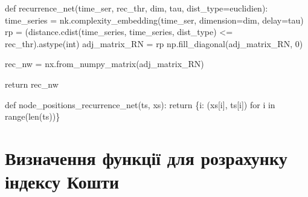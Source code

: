\documentclass[
  letterpaper,
]{report}
\newenvironment{Shaded}{\begin{snugshade}}{\end{snugshade}}
\newcommand{\BuiltInTok}[1]{\textcolor[rgb]{0.00,0.23,0.31}{#1}}
\newcommand{\ControlFlowTok}[1]{\textcolor[rgb]{0.00,0.23,0.31}{#1}}
\newcommand{\DecValTok}[1]{\textcolor[rgb]{0.68,0.00,0.00}{#1}}
\newcommand{\KeywordTok}[1]{\textcolor[rgb]{0.00,0.23,0.31}{#1}}
\newcommand{\NormalTok}[1]{\textcolor[rgb]{0.00,0.23,0.31}{#1}}
\newcommand{\OperatorTok}[1]{\textcolor[rgb]{0.37,0.37,0.37}{#1}}
\newcommand{\StringTok}[1]{\textcolor[rgb]{0.13,0.47,0.30}{#1}}
\begin{document}
\begin{Shaded}
\begin{Highlighting}[]
\KeywordTok{def}\NormalTok{ recurrence\_net(time\_ser, rec\_thr, dim, tau, dist\_type}\OperatorTok{=}\StringTok{\textquotesingle{}euclidien\textquotesingle{}}\NormalTok{):}
\NormalTok{    time\_series }\OperatorTok{=}\NormalTok{ nk.complexity\_embedding(time\_ser, dimension}\OperatorTok{=}\NormalTok{dim, delay}\OperatorTok{=}\NormalTok{tau)}
\NormalTok{    rp }\OperatorTok{=}\NormalTok{ (distance.cdist(time\_series, time\_series, dist\_type) }\OperatorTok{\textless{}=}\NormalTok{ rec\_thr).astype(}\BuiltInTok{int}\NormalTok{)}
\NormalTok{    adj\_matrix\_RN }\OperatorTok{=}\NormalTok{ rp}
\NormalTok{    np.fill\_diagonal(adj\_matrix\_RN, }\DecValTok{0}\NormalTok{)}

\NormalTok{    rec\_nw }\OperatorTok{=}\NormalTok{ nx.from\_numpy\_matrix(adj\_matrix\_RN)}
    
    \ControlFlowTok{return}\NormalTok{ rec\_nw}

\KeywordTok{def}\NormalTok{ node\_positions\_recurrence\_net(ts, xs):}
    \ControlFlowTok{return}\NormalTok{ \{i: (xs[i], ts[i]) }\ControlFlowTok{for}\NormalTok{ i }\KeywordTok{in} \BuiltInTok{range}\NormalTok{(}\BuiltInTok{len}\NormalTok{(ts))\}}
\end{Highlighting}
\end{Shaded}

\hypertarget{ux432ux438ux437ux43dux430ux447ux435ux43dux43dux44f-ux444ux443ux43dux43aux446ux456ux457-ux434ux43bux44f-ux440ux43eux437ux440ux430ux445ux443ux43dux43aux443-ux456ux43dux434ux435ux43aux441ux443-ux43aux43eux448ux442ux438}{%
\section{Визначення функції для розрахунку індексу
Кошти}\label{ux432ux438ux437ux43dux430ux447ux435ux43dux43dux44f-ux444ux443ux43dux43aux446ux456ux457-ux434ux43bux44f-ux440ux43eux437ux440ux430ux445ux443ux43dux43aux443-ux456ux43dux434ux435ux43aux441ux443-ux43aux43eux448ux442ux438}}
\end{document}
